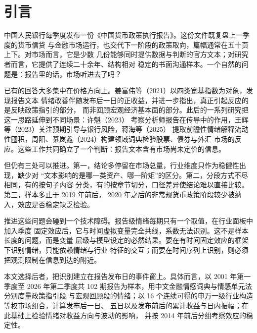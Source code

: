 
\section{引言}

中国人民银行每季度发布一份《中国货币政策执行报告》。这份文件既复盘上一季度的货币信贷
与金融市场运行，也交代下一阶段的政策取向，篇幅通常在五十页上下。对市场而言，它是少数
几份能够同时提供数据与判断的官方文本；对研究者而言，它提供了连续二十余年、结构相对
稳定的书面沟通样本。一个自然的问题是：报告里的话，市场听进去了吗？

已有的回答大多集中在价格方向上。姜富伟等（2021）以四类宽基指数为对象，发现报告文本
情绪改善伴随发布后一日的正收益，并进一步指出，真正引起反应的是反映政策指引的部分，
而非回顾宏观经济基本面的部分。此后的一系列研究把这一思路延伸到不同场景：许魁（2023）
考察分析师报告在传导中的作用，王辉等（2023）关注预期引导与银行风险，蒋海等（2025）
提取前瞻性情绪解释流动性囤积，周阳、綦岚鑫（2024）构建领域词典检验股票、债券与外汇
市场的反应。这些工作共同确立了一个判断：报告文本含有市场尚未定价的信息。

但仍有三处可以推进。第一，结论多停留在市场总量，行业维度只作为稳健性出现，缺少对
“文本影响的是哪一类资产、哪一阶矩”的区分。第二，分段方式不尽相同，有的按句子内容
分类，有的按章节切分，口径差异使结论难以直接比较。第三，样本多止于 2019 年前后，
2020 年之后的非常规货币政策阶段较少被纳入，效应是否稳定缺乏检验。

推进这些问题会碰到一个技术障碍。报告级情绪每期只有一个取值，在行业面板中加入季度
固定效应后，它与时间虚拟变量完全共线，系数无法识别。这不是样本长度的问题，而是变量
层级与模型设定的必然结果。要在有时间固定效应的框架下识别情绪，只能依赖情绪与行业
特征的交互；而要在时间序列上识别，则必须把观测限制在信息到达的附近。

本文选择后者，把识别建立在报告发布日的事件窗上。具体而言，以 2001 年第一季度至
2026 年第二季度共 102 期报告为样本，用中文金融情感词典与情感单元法分别度量政策指引段
与宏观回顾段的情绪；以 16 个连续可得的申万一级行业构造等权市场组合，计算发布后一日、
五日以及发布前后的累计收益与日内振幅；在此基础上检验情绪对收益方向与波动的影响，
并按 2014 年前后分组考察效应的稳定性。

